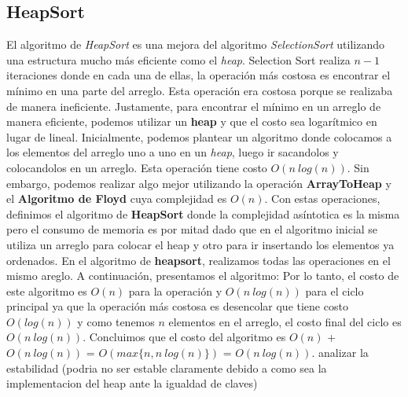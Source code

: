 \documentclass[10pt,a4paper]{article}
\begin{document}
\subsection{HeapSort}

El algoritmo de \textit{HeapSort} es una mejora del algoritmo \textit{SelectionSort} utilizando una estructura mucho más eficiente como el \textit{heap}.   
\newline
\newline
Selection Sort realiza $n-1$ iteraciones donde en cada una de ellas, la operación más costosa es encontrar el mínimo en una parte del arreglo. Esta operación era costosa porque se realizaba de manera ineficiente. Justamente, para encontrar el mínimo en un arreglo de manera eficiente, podemos utilizar un \textbf{heap} y que el costo sea logarítmico en lugar de lineal.  
\newline
\newline
Inicialmente, podemos plantear un algoritmo donde colocamos a los elementos del arreglo uno a uno en un \textit{heap}, luego ir sacandolos y colocandolos en un arreglo. Esta operación tiene costo $O(n~log(n))$.
\newline
\newline
Sin embargo, podemos realizar algo mejor utilizando la operación \textbf{ArrayToHeap} y el \textbf{Algoritmo de Floyd} cuya complejidad es $O(n)$. Con estas operaciones, definimos el algoritmo de \textbf{HeapSort} donde la complejidad asíntotica es la misma pero el consumo de memoria es por mitad dado que en el algoritmo inicial se utiliza un arreglo para colocar el heap y otro para ir insertando los elementos ya ordenados. En el algoritmo de \textbf{heapsort}, realizamos todas las operaciones en el mismo areglo.
\newline
\newline
A continuación, presentamos el algoritmo:
\newline
\newline
{}
\newline
\newline
{}
\newline
\newline
{}
\newline
\newline
{}
\newline
\newline
{}
\newline
\newline
Por lo tanto, el costo de este algoritmo es $O(n)$ para la operación  y $O(n~log(n))$ para el ciclo principal ya que la operación más costosa es desencolar que tiene costo $O(log(n))$ y como tenemos $n$ elementos en el arreglo, el costo final del ciclo es $O(n~log(n))$. Concluimos que el costo del algoritmo es $O(n)$ + $O(n~log(n))$ = $O(max\{n,n~log(n)\})$ = $O(n~log(n))$. 
\newline
\newline
analizar la estabilidad (podria no ser estable claramente debido a como sea la implementacion del heap ante la igualdad de claves)
\newpage
\end{document}
